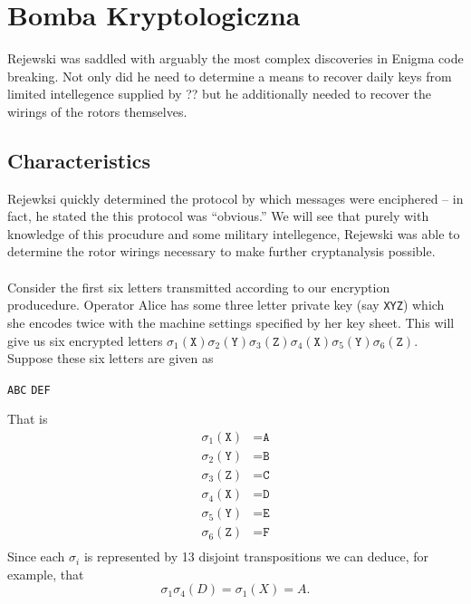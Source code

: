 \chapter{Bomba Kryptologiczna}

Rejewski was saddled with arguably the most complex discoveries in
Enigma code breaking. Not only did he need to determine a means to
recover daily keys from limited intellegence supplied by ?? but he
additionally needed to recover the wirings of the rotors themselves.
\section{Characteristics}
Rejewksi quickly determined the protocol by which messages were
enciphered -- in fact, he stated the this protocol was ``obvious.''
We will see that purely with knowledge of this procudure and some
military intellegence, Rejewski was able to determine the rotor
wirings necessary to make further cryptanalysis possible.
\\\\Consider the first six letters transmitted according to our
encryption producedure. Operator Alice has some three letter private
key (say \texttt{XYZ}) which she encodes twice with the machine
settings specified by her key sheet. This will give us six encrypted
letters
$\sigma_1(\texttt{X})\sigma_2(\texttt{Y})\sigma_3(\texttt{Z})\sigma_4(\texttt{X})\sigma_5(\texttt{Y})\sigma_6(\texttt{Z})$.
Suppose these six letters are given as
\begin{center}
  \texttt{ABC} \texttt{DEF}
\end{center}
That is
\begin{align*}
  \sigma_1(\texttt{X}) & = \texttt{A} \\
  \sigma_2(\texttt{Y}) & = \texttt{B} \\
  \sigma_3(\texttt{Z}) & = \texttt{C} \\
  \sigma_4(\texttt{X}) & = \texttt{D} \\
  \sigma_5(\texttt{Y}) & = \texttt{E} \\
  \sigma_6(\texttt{Z}) & = \texttt{F} \\
\end{align*}
Since each $\sigma_i$ is represented by 13 disjoint transpositions we
can deduce, for example, that
\[
  \sigma_1\sigma_4(D) = \sigma_1(X) = A.
\]
